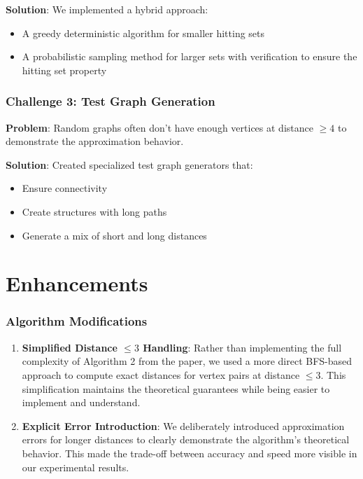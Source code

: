 \documentclass[a4paper,11pt,oneside]{book}
\begin{document}
\textbf{Solution}: We implemented a hybrid approach:
\begin{itemize}
    \item A greedy deterministic algorithm for smaller hitting sets
    \item A probabilistic sampling method for larger sets with verification to ensure the hitting set property
\end{itemize}

\section*{Challenge 3: Test Graph Generation}

\textbf{Problem}: Random graphs often don't have enough vertices at distance $\geq 4$ to demonstrate the approximation behavior.

\textbf{Solution}: Created specialized test graph generators that:
\begin{itemize}
    \item Ensure connectivity
    \item Create structures with long paths
    \item Generate a mix of short and long distances
\end{itemize}

\part{Enhancements}

\section*{Algorithm Modifications}

\begin{enumerate}
    \item \textbf{Simplified Distance $\leq 3$ Handling}: Rather than implementing the full complexity of Algorithm 2 from the paper, we used a more direct BFS-based approach to compute exact distances for vertex pairs at distance $\leq 3$. This simplification maintains the theoretical guarantees while being easier to implement and understand.

    \item \textbf{Explicit Error Introduction}: We deliberately introduced approximation errors for longer distances to clearly demonstrate the algorithm's theoretical behavior. This made the trade-off between accuracy and speed more visible in our experimental results.
\end{enumerate}
\end{document}
